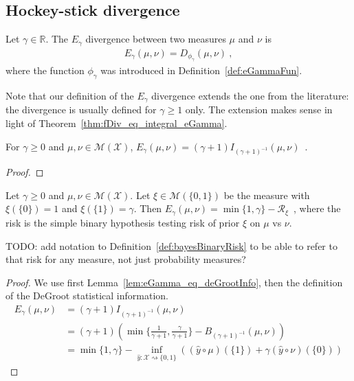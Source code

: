 \subsection{Hockey-stick divergence}

\begin{definition}
  \label{def:eGamma}
  Let $\gamma \in \mathbb{R}$. The $E_\gamma$ divergence between two measures $\mu$ and $\nu$ is
  \begin{align*}
  E_\gamma(\mu, \nu) = D_{\phi_\gamma}(\mu, \nu) \: ,
  \end{align*}
  where the function $\phi_\gamma$ was introduced in Definition~\ref{def:eGammaFun}.
\end{definition}

Note that our definition of the $E_\gamma$ divergence extends the one from the literature: the divergence is usually defined for $\gamma \ge 1$ only.
The extension makes sense in light of Theorem~\ref{thm:fDiv_eq_integral_eGamma}.

\begin{lemma}
  \label{lem:eGamma_eq_deGrootInfo}
  For $\gamma \ge 0$ and $\mu, \nu \in \mathcal M(\mathcal X)$, $E_\gamma(\mu, \nu) = (\gamma + 1) I_{(\gamma + 1)^{-1}}(\mu, \nu)$~.
\end{lemma}

\begin{proof}%
\uses{}

\end{proof}

\begin{lemma}
  \label{lem:eGamma_eq_sub_bayesBinaryRisk}
  Let $\gamma \ge 0$ and $\mu, \nu \in \mathcal M(\mathcal X)$. Let $\xi \in \mathcal M(\{0,1\})$ be the measure with $\xi(\{0\})=1$ and $\xi(\{1\}) = \gamma$. Then
  $E_\gamma(\mu, \nu) = \min\{1, \gamma\} - \mathcal R_\xi$~, where the risk is the simple binary hypothesis testing risk of prior $\xi$ on $\mu$ vs $\nu$.
\end{lemma}

TODO: add notation to Definition~\ref{def:bayesBinaryRisk} to be able to refer to that risk for any measure, not just probability measures?

\begin{proof}%
{}
We use first Lemma~\ref{lem:eGamma_eq_deGrootInfo}, then the definition of the DeGroot statistical information.
\begin{align*}
E_\gamma(\mu, \nu)
&= (\gamma + 1) I_{(\gamma + 1)^{-1}}(\mu, \nu)
\\
&= (\gamma + 1) \left( \min\{\frac{1}{\gamma + 1}, \frac{\gamma}{\gamma + 1}\} - B_{(\gamma + 1)^{-1}}(\mu, \nu) \right)
\\
&= \min\{1, \gamma\} - \inf_{\hat{y} : \mathcal X \rightsquigarrow \{0,1\}}\left((\hat{y} \circ \mu)(\{1\}) + \gamma (\hat{y} \circ \nu)(\{0\})\right)
\end{align*}

\end{proof}